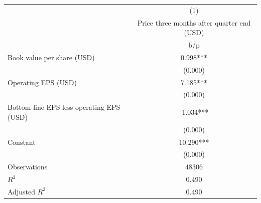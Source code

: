 {
\def\sym#1{\ifmmode^{#1}\else\(^{#1}\)\fi}
\begin{tabular}{l*{1}{c}}
\hline\hline
                    &\multicolumn{1}{c}{(1)}\\
                    &\multicolumn{1}{c}{Price three months after quarter end (USD)}\\
                    &         b/p   \\
\hline
Book value per share (USD)&       0.998***\\
                    &     (0.000)   \\
Operating EPS (USD) &       7.185***\\
                    &     (0.000)   \\
Bottom-line EPS less operating EPS (USD)&      -1.034***\\
                    &     (0.000)   \\
Constant            &      10.290***\\
                    &     (0.000)   \\
\hline
Observations        &       48306   \\
\(R^{2}\)           &       0.490   \\
Adjusted \(R^{2}\)  &       0.490   \\
\hline\hline
\end{tabular}
}
